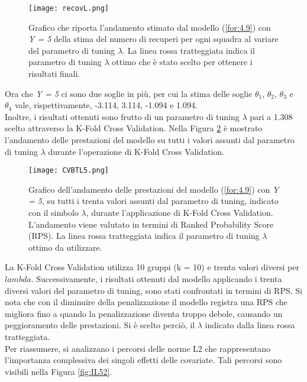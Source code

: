 \begin{figure}[htbp]
	\begin{center}
		\texttt{[image: recovL.png]}
		\caption{Grafico che riporta l'andamento stimato dal modello (\ref{for:4.9}) con \emph{Y = 5} della stima del numero di recuperi per ogni squadra al variare del parametro di tuning $\lambda$. La linea rossa tratteggiata indica il parametro di tuning $\lambda$ ottimo che è stato scelto per ottenere i risultati finali.} \label{fig:recovL5}
	\end{center}
\end{figure}
Ora che \emph{Y = 5} ci sono due soglie in più, per cui la stima delle soglie $\theta_1$, $\theta_2$, $\theta_3$ e $\theta_4$ vale, rispettivamente, -3.114, 3.114, -1.094 e 1.094.\\
Inoltre, i risultati ottenuti sono frutto di un parametro di tuning $\lambda$ pari a 1.308 scelto attraverso la  K-Fold Cross Validation. Nella Figura \ref{fig:lambda3} è mostrato l'andamento delle prestazioni del modello su tutti i valori assunti dal parametro di tuning $\lambda$ durante l'operazione di K-Fold Cross Validation.
\begin{figure}[htbp]
	\begin{center}
		\texttt{[image: CVBTL5.png]}
		\caption{Grafico dell'andamento delle prestazioni del modello (\ref{for:4.9}) con \emph{Y = 5}, su tutti i trenta valori assunti dal parametro di tuning, indicato con il simbolo $\lambda$, durante l'applicazione di K-Fold Cross Validation. L'andamento viene valutato in termini di Ranked Probability Score (RPS). La linea rossa tratteggiata indica il parametro di tuning $\lambda$ ottimo da utilizzare.} \label{fig:lambda3}
	\end{center}
\end{figure}
La K-Fold Cross Validation utilizza 10 gruppi (k = 10) e trenta valori diversi per $lambda$. Successivamente, i risultati ottenuti dal modello applicando i trenta diversi valori del parametro di tuning, sono stati confrontati in termini di RPS. Si nota che con il diminuire della penalizzazione il modello registra una RPS che migliora fino a quando la penalizzazione diventa troppo debole, causando un peggioramento delle prestazioni. Si è scelto perciò, il $\lambda$ indicato dalla linea rossa tratteggiata.\\
Per riassumere, si analizzano i percorsi delle norme L2 che rappresentano l'importanza complessiva dei singoli effetti delle covariate. Tali percorsi sono visibili nella Figura \ref{fig:IL52}.
